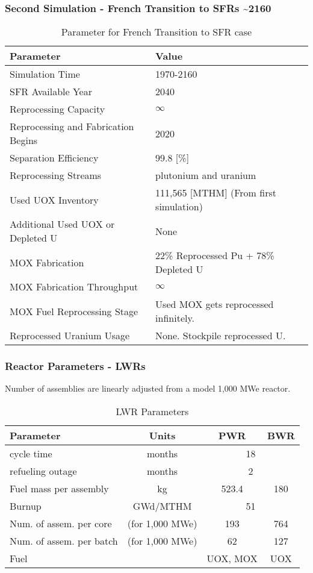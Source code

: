 \begin{frame}
	\frametitle{Second Simulation - French Transition to SFRs \textasciitilde 2160}
	
\begin{table}[h]
	\centering
	\begin{tabularx}{\textwidth}{bb}
		\hline
		Parameter & Value \\
		\hline
		Simulation Time & 1970-2160 \\
		\gls{SFR} Available Year & 2040 \\
		Reprocessing Capacity & $\infty$ \\
		Reprocessing and Fabrication Begins & 2020 \\
		Separation Efficiency & 99.8 [\%] \\
		Reprocessing Streams & plutonium and uranium \\
		\small{Used \gls{UOX} Inventory} & 111,565 [MTHM] {\small (From first simulation)} \\
		\small{Additional Used \gls{UOX} or Depleted U} & None  \\
		\gls{MOX} Fabrication &  \small{22\% Reprocessed Pu + 78\% Depleted U}  \\
		\gls{MOX} Fabrication Throughput & $\infty$ \\
		\gls{MOX} Fuel Reprocessing Stage &  Used \gls{MOX} gets reprocessed infinitely. \\
		Reprocessed Uranium Usage &  None. Stockpile reprocessed U. \\
		\hline
	\end{tabularx}
	\caption {Parameter for French Transition to \gls{SFR} case }
	\label{tab:sim_france}
\end{table}

\end{frame}


\begin{frame}
	\frametitle{Reactor Parameters - \glspl{LWR} }
	Number of assemblies are linearly adjusted from a model 1,000 MWe reactor.
	\begin{table}[h]
    \centering
    \begin{tabularx}{\textwidth}{bccc}
        \hline
        Parameter & Units & PWR & BWR \\
        \hline
        cycle time & months & \multicolumn{2}{c}{18}   \\ 
        refueling outage & months & \multicolumn{2}{c}{2}\\
        Fuel mass per assembly & kg & 523.4 & 180 \\
        Burnup & GWd/MTHM & \multicolumn{2}{c}{51} \\
        \small{Num. of assem. per core} & (for 1,000 MWe) & 193  & 764 \\
        \small{Num. of assem. per batch} & (for 1,000 MWe) & 62 & 127 \\
        Fuel & & \gls{UOX}, \gls{MOX} & \gls{UOX}  \\
        \hline
    \end{tabularx}
    \caption {\gls{LWR} Parameters}
    \label{tab:lwr}
    \end{table}
\end{frame}


